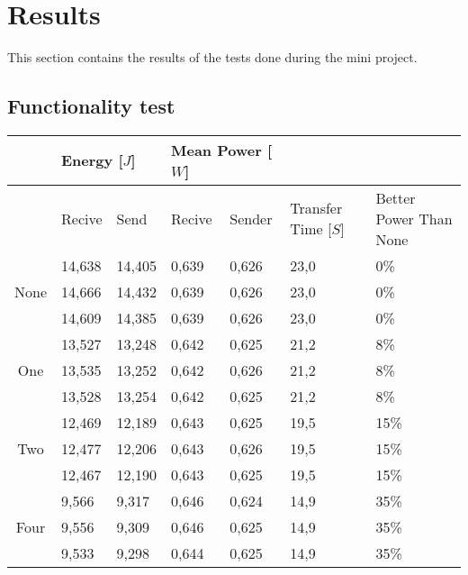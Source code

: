 \section{Results}
This section contains the results of the tests done during the mini project.
\subsection{Functionality test}
\begin{table}[h]
	\begin{tabular}{cllllll}

	\cline{2-5} 
	\multicolumn{1}{l}{} 	& \multicolumn{2}{l}{Energy {[$J$]}} & \multicolumn{2}{l}{Mean Power [$W$]} &	&	\\ \hline
	\rowcolor{gr}
	\multicolumn{1}{l}{Bit Removed}	& Recive	& Send	& Recive	& Sender	& \multicolumn{1}{l}{Transfer Time [$S$]} & \multicolumn{1}{l}{Better Power Than None} \\ \hline
	\multicolumn{1}{c}{\multirow{3}{*}{None}} & 14,638	& 14,405	& 0,639	& 0,626	& \multicolumn{1}{l}{23,0}	& \multicolumn{1}{l}{0\%}	\\  
	\multicolumn{1}{c}{}	& 14,666	& 14,432	& 0,639	& 0,626	& \multicolumn{1}{l}{23,0}	& \multicolumn{1}{l}{0\%}	\\ 
	\multicolumn{1}{c}{}	& 14,609	& 14,385	& 0,639	& 0,626	& \multicolumn{1}{l}{23,0}	& \multicolumn{1}{l}{0\%}	\\ \hline
	\multicolumn{1}{c}{\multirow{3}{*}{One}}  & 13,527	& 13,248	& 0,642	& 0,625	& \multicolumn{1}{l}{21,2}	& \multicolumn{1}{l}{8\%}	\\ %
	\multicolumn{1}{c}{}	& 13,535	& 13,252	& 0,642	& 0,626	& \multicolumn{1}{l}{21,2}	& \multicolumn{1}{l}{8\%}	\\ %
	\multicolumn{1}{c}{}	& 13,528	& 13,254	& 0,642	& 0,625	& \multicolumn{1}{l}{21,2}	& \multicolumn{1}{l}{8\%}	\\ \hline
	\multicolumn{1}{c}{\multirow{3}{*}{Two}}  & 12,469	& 12,189	& 0,643	& 0,625	& \multicolumn{1}{l}{19,5}	& \multicolumn{1}{l}{15\%}	\\ %
	\multicolumn{1}{c}{}	& 12,477	& 12,206	& 0,643	& 0,626	& \multicolumn{1}{l}{19,5}	& \multicolumn{1}{l}{15\%}	\\ %
	\multicolumn{1}{c}{}	& 12,467	& 12,190	& 0,643	& 0,625	& \multicolumn{1}{l}{19,5}	& \multicolumn{1}{l}{15\%}	\\ \hline
	\multicolumn{1}{c}{\multirow{3}{*}{Four}} & 9,566	& 9,317	& 0,646	& 0,624	& \multicolumn{1}{l}{14,9}	& \multicolumn{1}{l}{35\%}	\\ %
	\multicolumn{1}{c}{}	& 9,556	& 9,309	& 0,646	& 0,625	& \multicolumn{1}{l}{14,9}	& \multicolumn{1}{l}{35\%}	\\ %
	\multicolumn{1}{c}{}	& 9,533	& 9,298	& 0,644	& 0,625	& \multicolumn{1}{l}{14,9}	& \multicolumn{1}{l}{35\%}	\\ \hline
	\end{tabular}


\end{table}
